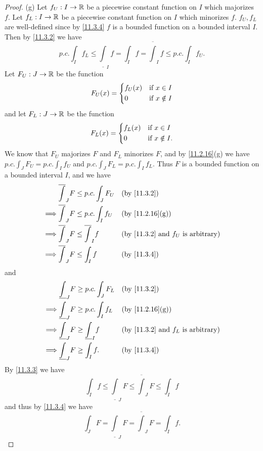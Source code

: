 \begin{proof}{(g)}
  Let \(f_U : I \to \mathbb{R}\) be a piecewise constant function on \(I\) which majorizes \(f\).
  Let \(f_L : I \to \mathbb{R}\) be a piecewise constant function on \(I\) which minorizes \(f\).
  \(f_U, f_L\) are well-defined since by \cref{11.3.4} \(f\) is a bounded function on a bounded interval \(I\).
  Then by \cref{11.3.2} we have
  \[
    p.c. \int_I f_L \leq \underline{\int}_I f = \int_I f = \overline{\int}_I f \leq p.c. \int_I f_U.
  \]
  Let \(F_U : J \to \mathbb{R}\) be the function
  \[
    F_U(x) = \begin{dcases}
      f_U(x) & \text{if } x \in I    \\
      0      & \text{if } x \notin I
    \end{dcases}
  \]
  and let \(F_L : J \to \mathbb{R}\) be the function
  \[
    F_L(x) = \begin{dcases}
      f_L(x) & \text{if } x \in I     \\
      0      & \text{if } x \notin I.
    \end{dcases}
  \]
  We know that \(F_U\) majorizes \(F\) and \(F_L\) minorizes \(F\), and by \cref{11.2.16}(g) we have \(p.c. \int_J F_U = p.c. \int_I f_U\) and \(p.c. \int_J F_L = p.c. \int_I f_L\).
  Thus \(F\) is a bounded function on a bounded interval \(I\), and we have
  \begin{align*}
             & \overline{\int}_J F \leq p.c. \int_J F_U     &  & \by{11.3.2}                                        \\
    \implies & \overline{\int}_J F \leq p.c. \int_I f_U     &  & \by{11.2.16}[g]                                    \\
    \implies & \overline{\int}_J F \leq \overline{\int}_I f &  & \text{(by \cref{11.3.2} and \(f_U\) is arbitrary)} \\
    \implies & \overline{\int}_J F \leq \int_I f            &  & \by{11.3.4}
  \end{align*}
  and
  \begin{align*}
             & \underline{\int}_J F \geq p.c. \int_J F_L      &  & \by{11.3.2}                                        \\
    \implies & \underline{\int}_J F \geq p.c. \int_I f_L      &  & \by{11.2.16}[g]                                    \\
    \implies & \underline{\int}_J F \geq \underline{\int}_I f &  & \text{(by \cref{11.3.2} and \(f_L\) is arbitrary)} \\
    \implies & \underline{\int}_J F \geq \int_I f.            &  & \by{11.3.4}
  \end{align*}
  By \cref{11.3.3} we have
  \[
    \int_I f \leq \underline{\int}_J F \leq \overline{\int}_J F \leq \int_I f
  \]
  and thus by \cref{11.3.4} we have
  \[
    \int_J F = \underline{\int}_J F = \overline{\int}_J F = \int_I f.
  \]
\end{proof}


